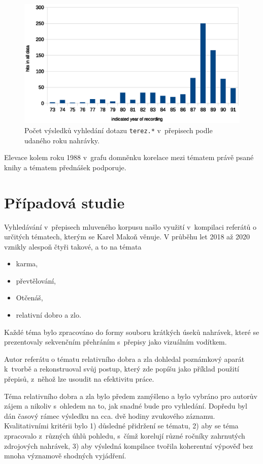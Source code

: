 \begin{figure}[htpb]
\includegraphics[scale=0.9]{rc/teresa-by-year.eps}
\caption{Počet výsledků vyhledání dotazu \texttt{terez.*} v~přepisech podle
udaného roku nahrávky.}
\label{fig:teresa-year}
\end{figure}

Elevace kolem roku 1988 v~grafu domněnku korelace mezi tématem právě psané knihy
a tématem přednášek podporuje.



\section{Případová studie}

Vyhledávání v~přepisech mluveného korpusu našlo využití v~kompilaci referátů o
určitých tématech, kterým se Karel Makoň věnuje. V průběhu let 2018 až 2020
vznikly alespoň čtyři takové, a to na témata
\begin{itemize}
\item{karma,}
\item{převtělování,}
\item{Otčenáš,}
\item{relativní dobro a zlo.}
\end{itemize}
Každé téma bylo zpracováno do formy souboru krátkých úseků nahrávek, které se
prezentovaly sekvenčním přehráním s~přepisy jako vizuálním vodítkem.

Autor referátu o tématu relativního dobra a zla dohledal poznámkový aparát
k~tvorbě a rekonstruoval svůj postup, který zde popíšu jako příklad použití
přepisů, z~něhož lze usoudit na efektivitu práce.

Téma relativního dobra a zla bylo předem zamýšleno a bylo vybráno pro autorův
zájem a nikoliv s~ohledem na to, jak snadné bude pro vyhledání. Dopředu byl dán
časový rámec výsledku na cca. dvě hodiny zvukového záznamu. Kvalitativními kritérii bylo
1) důsledné přidržení se tématu, 2) aby se téma zpracovalo z~různých úhlů
pohledu, s~čímž korelují různé ročníky zahrnutých zdrojových nahrávek, 3) aby
výsledná kompilace tvořila koherentní výpověď bez mnoha významově shodných
vyjádření.

